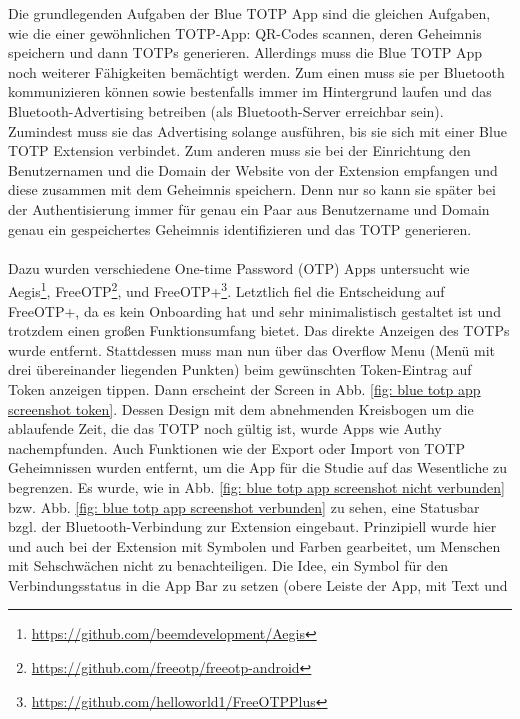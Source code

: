 Die grundlegenden Aufgaben der Blue TOTP App sind die gleichen Aufgaben, wie die 
einer gewöhnlichen TOTP-App: QR-Codes scannen, deren Geheimnis speichern und dann 
TOTPs generieren. Allerdings muss die Blue TOTP App noch weiterer Fähigkeiten 
bemächtigt werden. Zum einen muss sie per Bluetooth kommunizieren können sowie 
bestenfalls immer im Hintergrund laufen und das Bluetooth-Advertising betreiben 
(als Bluetooth-\glqq Server\grqq{} erreichbar sein). Zumindest muss sie das 
Advertising solange ausführen, bis sie sich mit einer Blue TOTP Extension 
verbindet. Zum anderen muss sie bei der Einrichtung den Benutzernamen und die 
Domain der Website von der Extension empfangen und diese zusammen mit dem Geheimnis 
speichern. Denn nur so kann sie später bei der Authentisierung immer für genau ein 
Paar aus Benutzername und Domain genau ein gespeichertes Geheimnis identifizieren 
und das TOTP generieren.
\\\\
Dazu wurden verschiedene One-time Password (OTP) Apps untersucht wie 
Aegis\footnote{\href{https://github.com/beemdevelopment/Aegis}{https://github.com/beemdevelopment/Aegis}}, FreeOTP\footnote{\href{https://github.com/freeotp/freeotp-android}{https://github.com/freeotp/freeotp-android}}, und FreeOTP+\footnote{\href{https://github.com/helloworld1/FreeOTPPlus}{https://github.com/helloworld1/FreeOTPPlus}}. 
Letztlich fiel die Entscheidung auf FreeOTP+, da es kein Onboarding hat und sehr 
minimalistisch gestaltet ist und trotzdem einen großen Funktionsumfang bietet. Das 
direkte Anzeigen des TOTPs wurde entfernt. Stattdessen muss man nun über das 
Overflow Menu (Menü mit drei übereinander liegenden Punkten) beim gewünschten 
Token-Eintrag auf \glqq Token anzeigen\grqq{} tippen. Dann erscheint der Screen in 
Abb. \ref{fig: blue totp app screenshot token}. Dessen Design mit dem abnehmenden 
Kreisbogen um die ablaufende Zeit, die das TOTP noch gültig ist, wurde Apps wie 
Authy nachempfunden. Auch Funktionen wie der Export oder Import von TOTP 
Geheimnissen wurden entfernt, um die App für die Studie auf das Wesentliche zu 
begrenzen. Es wurde, wie in Abb. \ref{fig: blue totp app screenshot nicht verbunden} 
bzw. Abb. \ref{fig: blue totp app screenshot verbunden} zu sehen, eine Statusbar 
bzgl. der Bluetooth-Verbindung zur Extension eingebaut. Prinzipiell wurde hier und 
auch bei der Extension mit Symbolen und Farben gearbeitet, um Menschen mit 
Sehschwächen nicht zu benachteiligen. Die Idee, ein Symbol für den 
Verbindungsstatus in die App Bar zu setzen (obere Leiste der App, mit Text und 

